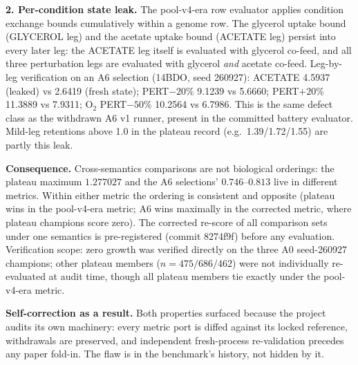 \documentclass[12pt,a4paper]{article}
\begin{document}
\textbf{2. Per-condition state leak.} The pool-v4-era row evaluator applies condition exchange bounds cumulatively within a genome row. The glycerol uptake bound (GLYCEROL leg) and the acetate uptake bound (ACETATE leg) persist into every later leg: the ACETATE leg itself is evaluated with glycerol co-feed, and all three perturbation legs are evaluated with glycerol \emph{and} acetate co-feed. Leg-by-leg verification on an A6 selection (14BDO, seed 260927): ACETATE 4.5937 (leaked) vs 2.6419 (fresh state); PERT$-20$\% 9.1239 vs 5.6660; PERT$+20$\% 11.3889 vs 7.9311; O$_2$ PERT$-50$\% 10.2564 vs 6.7986. This is the same defect class as the withdrawn A6 v1 runner, present in the committed battery evaluator. Mild-leg retentions above 1.0 in the plateau record (e.g.\ 1.39/1.72/1.55) are partly this leak.

\textbf{Consequence.} Cross-semantics comparisons are not biological orderings: the plateau maximum $1.277027$ and the A6 selections' $0.746$--$0.813$ live in different metrics. Within either metric the ordering is consistent and opposite (plateau wins in the pool-v4-era metric; A6 wins maximally in the corrected metric, where plateau champions score zero). The corrected re-score of all comparison sets under one semantics is pre-registered (commit 8274f9f) before any evaluation. Verification scope: zero growth was verified directly on the three A0 seed-260927 champions; other plateau members ($n = 475/686/462$) were not individually re-evaluated at audit time, though all plateau members tie exactly under the pool-v4-era metric.

\textbf{Self-correction as a result.} Both properties surfaced because the project audits its own machinery: every metric port is diffed against its locked reference, withdrawals are preserved, and independent fresh-process re-validation precedes any paper fold-in. The flaw is in the benchmark's history, not hidden by it.
\end{document}
